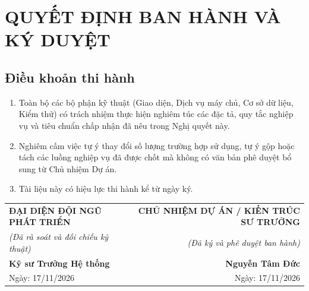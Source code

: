 \documentclass[10pt,a4paper]{article}
\begin{document}
\section{QUYẾT ĐỊNH BAN HÀNH VÀ KÝ DUYỆT}

\subsection{Điều khoản thi hành}
\begin{enumerate}[itemsep=2pt]
    \item Toàn bộ các bộ phận kỹ thuật (Giao diện, Dịch vụ máy chủ, Cơ sở dữ liệu, Kiểm thử) có trách nhiệm thực hiện nghiêm túc các đặc tả, quy tắc nghiệp vụ và tiêu chuẩn chấp nhận đã nêu trong Nghị quyết này.
    \item Nghiêm cấm việc tự ý thay đổi số lượng trường hợp sử dụng, tự ý gộp hoặc tách các luồng nghiệp vụ đã được chốt mà không có văn bản phê duyệt bổ sung từ Chủ nhiệm Dự án.
    \item Tài liệu này có hiệu lực thi hành kể từ ngày ký.
\end{enumerate}

\vspace{1.5cm}
\noindent
\begin{tabularx}{\textwidth}{X r}
\textbf{ĐẠI DIỆN ĐỘI NGŨ PHÁT TRIỂN} & \textbf{CHỦ NHIỆM DỰ ÁN / KIẾN TRÚC SƯ TRƯỞNG} \\[0.3cm]
\textit{(Đã rà soát và đối chiếu kỹ thuật)} & \textit{(Đã ký và phê duyệt ban hành)} \\[2.5cm]
\textbf{Kỹ sư Trưởng Hệ thống} & \textbf{Nguyễn Tâm Đức} \\
Ngày: 17/11/2026 & Ngày: 17/11/2026 \\
\end{tabularx}
\end{document}
